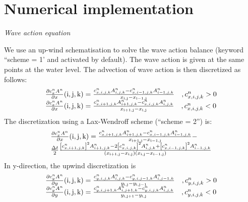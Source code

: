 \chapter{Numerical implementation}


{\it  Wave action equation}

We use an up-wind schematisation to solve the wave action balance (keyword ``scheme = 1' and activated by default). The wave action is given at the same points at the water level. The advection of wave action is then discretized as follows:
\begin{equation} \label{1)} 
\begin{array}{l} {\frac{\partial c_{x}^{n} A^{n} }{\partial x} {\rm (i,j,k)}=\frac{c_{x,i,j,k}^{n} A_{i,j,k}^{n} -c_{x,i-1,j,k}^{n} A_{i-1,j,k}^{n} }{x_{{\rm i,j}} -x_{{\rm i-1,j}} } \quad ,c_{x,i,j,k}^{n} >0} \\ {\frac{\partial c_{x}^{n} A^{n} }{\partial x} {\rm (i,j,k)}=\frac{c_{x,i+1,j,k}^{n} A_{i+1,j,k}^{n} -c_{x,i,j,k}^{n} A_{i,j,k}^{n} }{x_{{\rm i+1,j}} -x_{{\rm i,j}} } \quad ,c_{x,i,j,k}^{n} <0} \end{array} 
\end{equation} 
The discretization using a Lax-Wendroff scheme (``scheme = 2'') is:
\begin{equation} \label{2)} 
\begin{array}{l} {\frac{\partial c_{x}^{n} A^{n} }{\partial x} {\rm (i,j,k)}=\frac{c_{x,i+1,j,k}^{n} A_{i+1,j,k}^{n} -c_{x,i-1,j,k}^{n} A_{i-1,j,k}^{n} }{x_{{\rm i+1,j}} -x_{{\rm i-1,j}} } -} \\ {\frac{\Delta t}{2} \frac{\left[c_{x,i+1,j,k}^{n} \right]^{2} A_{i+1,j,k}^{n} -2\left[c_{x,i,j,k}^{n} \right]^{2} A_{i,j,k}^{n} +\left[c_{x,i-1,j,k}^{n} \right]^{2} A_{i-1,j,k}^{n} }{\left(x_{{\rm i+1,j}} -x_{{\rm i,j}} \right)\left(x_{{\rm i,j}} -x_{{\rm i-1,j}} \right)} } \end{array} 
\end{equation} 
In y-direction, the upwind discretization is
\begin{equation} \label{3)} 
\begin{array}{l} {\frac{\partial c_{y}^{n} A^{n} }{\partial y} {\rm (i,j,k)}=\frac{c_{y,i,j,k}^{n} A_{i,j,k}^{n} -c_{y,i,j-1,k}^{n} A_{i,j-1,k}^{n} }{y_{{\rm i,j}} -y_{{\rm i,j-1}} } \quad ,c_{y,i,j,k}^{n} >0} \\ {\frac{\partial c_{y}^{n} A^{n} }{\partial y} {\rm (i,j,k)}=\frac{c_{y,i,j+1,k}^{n} A_{i,j+1,k}^{n} -c_{y,i,j,k}^{n} A_{i,j,k}^{n} }{y_{{\rm i,j+1}} -y_{{\rm i,j}} } \quad ,c_{y,i,j,k}^{n} <0} \end{array} 
\end{equation} 
